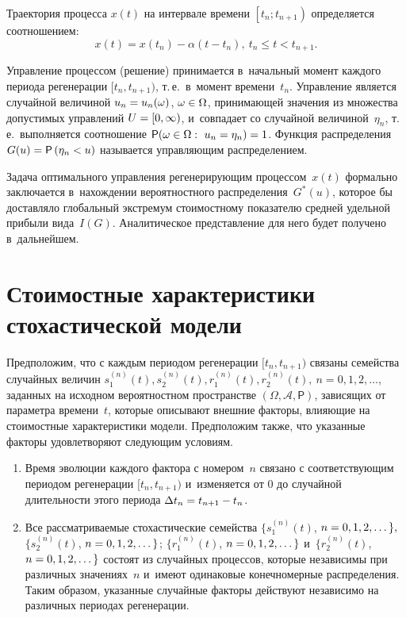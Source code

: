 \begin{multicols}{2}
Траектория процесса $x(t)$ на интервале времени $\left[t_n;t_{n+1}\right)$ 
определяется соотношением:
$$  
x(t)=x(t_n)-\alpha\left(t-t_n\right),\ t_n\le t<t_{n+1}.
$$


Управление процессом (решение) принимается в~начальный момент каждого периода 
регенерации $[t_n,t_{n+1})$, т.\,е.\ в~момент времени~$t_n$. Управление является 
случайной величиной $u_n\hm=u_n(\omega)$, $\omega\hm\in\Omega$, принимающей значения из 
множества допустимых управлений $U\hm=[0,\infty)$, и~совпадает со случайной 
величиной~$\eta_n$, т.\,е.\ выполняется соотношение $\mathsf{P}(\omega\in\Omega:\ u_n\hm=\eta_n)\hm=1$. Функция распределения $G(u)\hm=\mathsf{P}\left(
\eta_n\hm<u\right)$ называется управляющим распределением.

Задача оптимального управления ре\-ге\-не\-ри\-ру\-ющим процессом~$x(t)$ формально заключается 
в~на\-хож\-де\-нии вероятностного распределения~$G^\ast(u)$, которое бы доставляло 
глобальный экстремум стоимостному показателю средней удельной прибыли 
вида~$I(G)$. Аналитическое представление для него будет получено в~дальнейшем.

\vspace*{-6pt}

\section{Стоимостные характеристики стохастической модели}

\vspace*{-3pt}

Предположим, что с каждым периодом регенерации  $[t_n,t_{n+1})$ связаны 
семейства случайных величин 
$s_1^{(n)}(t),s_2^{(n)}(t),r_1^{(n)}(t),r_2^{(n)}(t),~n=0,1,2,\dots$, заданных 
на исходном вероятностном пространстве $(\Omega,\mathcal{A},\mathsf{P})$, зависящих 
от параметра времени~$t$, которые описывают внешние факторы, влияющие на 
стоимостные характеристики модели. Предположим также, что указанные факторы 
удовлетворяют следующим условиям.
\begin{enumerate}[1.]
\item Время эволюции каждого фактора с номером~$n$ связано с соответствующим 
периодом регенерации $[t_n,t_{n+1})$ и~изменяется от 0 до случайной длительности 
этого периода $\Delta t_n\hm=t_{n+1}\hm-t_n$.

\item Все рассматриваемые стохастические семейства 
$\{s_1^{(n)}(t)$, $n\hm=0,1,2,\dots\},$  $\{s_2^{(n)}(t)$, $n\hm=0,1,2,\dots\}$; 
$\{r_1^{(n)}(t)$, $n\hm=0,1,2,\dots\}$ и~$\{r_2^{(n)}(t)$, $n\hm=0,1,2,\dots\}$ состоят из 
случайных процессов, которые независимы при различных значениях~$n$ и~имеют 
одинаковые конечномерные распределения. Таким образом, указанные случайные 
факторы действуют независимо на различных периодах регенерации.
\end{enumerate}


\end{multicols}
